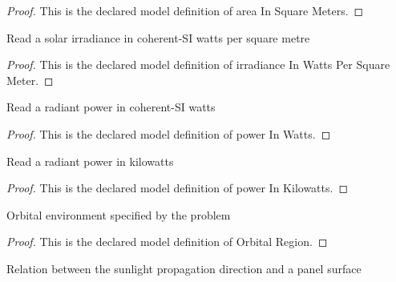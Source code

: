 \begin{proof}
  This is the declared model definition of area In Square Meters.
\end{proof}
\begin{definition}
  \label{def:physics:phyx-mini-0945:phyxminiproblems-problemphyxmini0945-irradianceinwattspersquaremeter}
  Read a solar irradiance in coherent-SI watts per square metre
\end{definition}
\begin{proof}
  This is the declared model definition of irradiance In Watts Per Square Meter.
\end{proof}
\begin{definition}
  \label{def:physics:phyx-mini-0945:phyxminiproblems-problemphyxmini0945-powerinwatts}
  Read a radiant power in coherent-SI watts
\end{definition}
\begin{proof}
  This is the declared model definition of power In Watts.
\end{proof}
\begin{definition}
  \label{def:physics:phyx-mini-0945:phyxminiproblems-problemphyxmini0945-powerinkilowatts}
  Read a radiant power in kilowatts
\end{definition}
\begin{proof}
  This is the declared model definition of power In Kilowatts.
\end{proof}
\begin{definition}
  \label{def:physics:phyx-mini-0945:phyxminiproblems-problemphyxmini0945-orbitalregion}
  Orbital environment specified by the problem
\end{definition}
\begin{proof}
  This is the declared model definition of Orbital Region.
\end{proof}
\begin{definition}
  \label{def:physics:phyx-mini-0945:phyxminiproblems-problemphyxmini0945-radiationincidence}
  Relation between the sunlight propagation direction and a panel surface
\end{definition}
